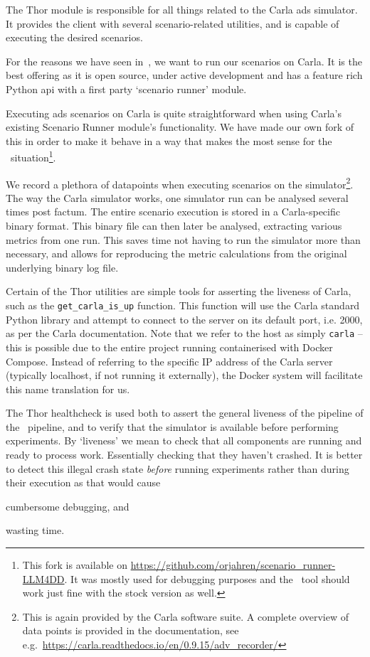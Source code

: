 The Thor module is responsible for all things related to the Carla \acrshort{ads}
simulator. It provides the client with several scenario-related utilities, and
is capable of executing the desired scenarios.

For the reasons we have seen in~, we want to run our
scenarios on Carla. It is the best offering as it is open source, under active
development and has a feature rich Python \acrshort{api} with a first party
`scenario runner' module.

Executing \acrshort{ads} scenarios on Carla is quite straightforward when using
Carla's existing Scenario Runner module's functionality. We have made
our own fork of this in order to make it behave in a way that makes the most
sense for the \hefe~situation\footnote{This fork is available on
    \url{https://github.com/orjahren/scenario_runner-LLM4DD}. It was mostly used for
    debugging purposes and the \hefe~tool should work just fine with the stock
    version as well.}.

We record a plethora of datapoints when executing scenarios on the simulator\footnote{This is again
    provided by the Carla software suite. A complete overview of data points is provided in the
    documentation, see e.g.~\url{https://carla.readthedocs.io/en/0.9.15/adv_recorder/}}.
The way the Carla simulator works, one simulator run can be analysed several
times post factum. The entire scenario execution is stored in a Carla-specific
binary format. This binary file can then later be analysed, extracting various
metrics from one run. This saves time not having to run the simulator more than
necessary, and allows for reproducing the metric calculations from the original
underlying binary log file.

Certain of the Thor utilities are simple tools for asserting the liveness of
Carla, such as the \texttt{get\_carla\_is\_up} function. This function will use
the Carla standard Python library and attempt to connect to the server on its
default port, i.e. \num{2000}, as per the Carla documentation. Note that we
refer to the host as simply \texttt{carla} -- this is possible due to the entire
project running containerised with Docker Compose. Instead of referring to the
specific IP address of the Carla server (typically localhost, if not running it
externally), the Docker system will facilitate this name translation for us.

The Thor healthcheck is used both to assert the general liveness of the pipeline
of the \hefe~pipeline, and to verify that the simulator is available before
performing experiments. By `liveness' we mean to check that all components are running
and ready to process work. Essentially checking that they haven't crashed.
It is better to detect this illegal crash state \emph{before} running experiments rather
than during their execution as that would cause \begin{inparaenum}
    \item cumbersome debugging, and
    \item wasting time.
\end{inparaenum}

